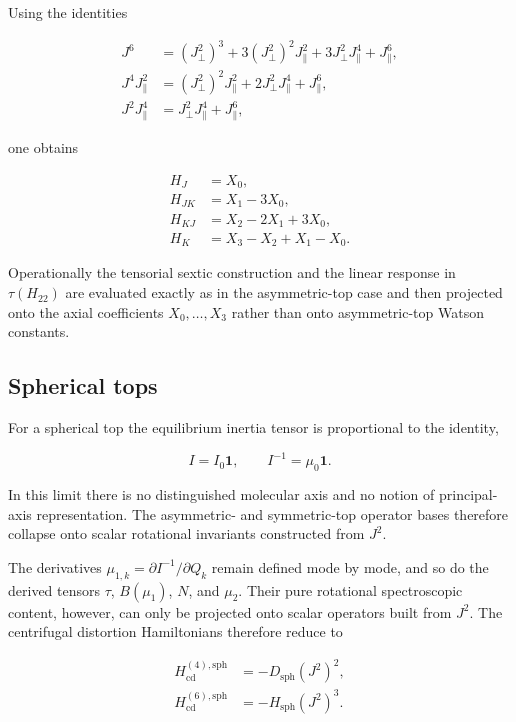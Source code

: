 \documentclass[aip,jcp,reprint,floatfix]{revtex4-2}
\begin{document}
Using the identities

\begin{align}
J^6 &= (J_{\perp}^2)^3 +3(J_{\perp}^2)^2J_{\parallel}^2
+3J_{\perp}^2J_{\parallel}^4 +J_{\parallel}^6, \\
J^4J_{\parallel}^2 &= (J_{\perp}^2)^2J_{\parallel}^2
+2J_{\perp}^2J_{\parallel}^4 +J_{\parallel}^6, \\
J^2J_{\parallel}^4 &= J_{\perp}^2J_{\parallel}^4+J_{\parallel}^6 ,
\end{align}

one obtains

\begin{align}
H_J &= X_0, \\
H_{JK} &= X_1-3X_0, \\
H_{KJ} &= X_2-2X_1+3X_0, \\
H_K &= X_3-X_2+X_1-X_0 .
\label{eq:app_sym_sextic_constants}
\end{align}

Operationally the tensorial sextic construction and the linear response
in $\tau(H_{22})$ are evaluated exactly as in the asymmetric-top case
and then projected onto the axial coefficients $X_0,\ldots,X_3$ rather
than onto asymmetric-top Watson constants.

\subsection{Spherical tops}

For a spherical top the equilibrium inertia tensor is proportional to
the identity,

\begin{equation}
I = I_0 \mathbf 1,
\qquad
I^{-1} = \mu_0 \mathbf 1 .
\end{equation}

In this limit there is no distinguished molecular axis and no notion of
principal-axis representation. The asymmetric- and symmetric-top
operator bases therefore collapse onto scalar rotational invariants
constructed from $J^2$.

The derivatives $\mu_{1,k}=\partial I^{-1}/\partial Q_k$ remain defined
mode by mode, and so do the derived tensors $\tau$, $B(\mu_1)$, $N$, and
$\mu_2$. Their pure rotational spectroscopic content, however, can only
be projected onto scalar operators built from $J^2$. The centrifugal
distortion Hamiltonians therefore reduce to

\begin{align}
H_{\mathrm{cd}}^{(4),\mathrm{sph}} &= -D_{\mathrm{sph}} (J^2)^2, \\
H_{\mathrm{cd}}^{(6),\mathrm{sph}} &= -H_{\mathrm{sph}} (J^2)^3 .
\end{align}
\end{document}
